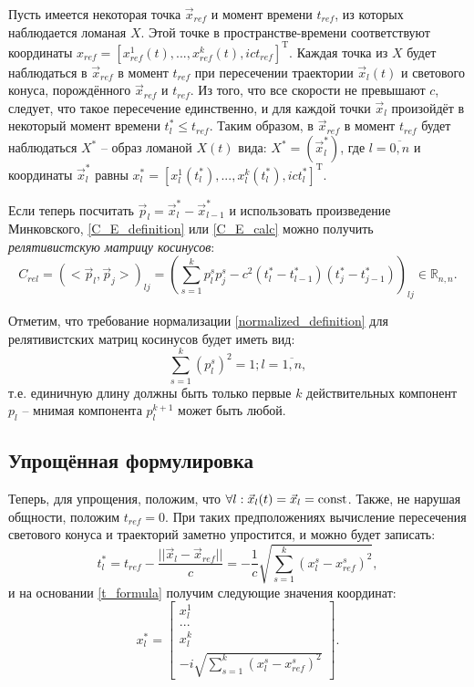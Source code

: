 Пусть имеется некоторая точка $\vec{x}_{ref}$ и момент времени $t_{ref}$, из которых наблюдается ломаная $X$. Этой точке в пространстве-времени соответствуют координаты $x_{ref} = [x^1_{ref}(t), ..., x^k_{ref}(t), ict_{ref}]^\mathrm{T}$. Каждая точка из $X$ будет наблюдаться в $\vec{x}_{ref}$ в момент $t_{ref}$ при пересечении траектории $\vec{x}_l(t)$ и светового конуса, порождённого $\vec{x}_{ref}$ и $t_{ref}$. Из того, что все скорости не превышают $c$, следует, что такое пересечение единственно, и для каждой точки $\vec{x}_l$ произойдёт в некоторый момент времени $t^*_l \le t_{ref}$. Таким образом, в $\vec{x}_{ref}$ в момент $t_{ref}$ будет наблюдаться $X^*$ -- образ ломаной $X(t)$ вида:
$X^* = (\vec{x}^*_l)$, где $l = \overline{0,n}$ и координаты $\vec{x}^*_l$ равны $x^*_l = [x^1_l(t^*_l), ..., x^k_l(t^*_l), ict^*_l]^\mathrm{T}$.

Если теперь посчитать $\vec{p}_l = \vec{x}^*_l - \vec{x}^*_{l-1}$ и использовать произведение Минковского, \ref{C_E_definition} или \ref{C_E_calc} можно получить \textit{релятивистскую матрицу косинусов}:
\begin{equation}
	C_{rel} = {(<\vec{p}_{l}, \vec{p}_{j}>)}_{lj} = {\left(\sum_{s=1}^{k} p^s_l p^s_j - c^2(t^*_l - t^*_{l-1})(t^*_j - t^*_{j-1})\right)}_{lj} \in \mathbb{R}_{n,n}.
	\label{C_rel_definition}
\end{equation}

Отметим, что требование нормализации \ref{normalized_definition} для релятивистских матриц косинусов будет иметь вид:
 \begin{equation}
	\sum_{s=1}^{k} {(p^s_l)}^2 = 1; l = \overline{1,n},
	\label{normalized_definition_rel}
\end{equation}
т.е. единичную длину должны быть только первые $k$ действительных компонент $p_l$ -- мнимая компонента $p^{k+1}_l$ может быть любой.

\subsection{Упрощённая формулировка}
Теперь, для упрощения, положим, что $\forall{l}: \vec{x}_l(t) = \vec{x}_l = \operatorname{const}$. Также, не нарушая общности, положим $t_{ref} = 0$. При таких предположениях вычисление пересечения светового конуса и траекторий заметно упростится, и можно будет записать:
\begin{equation}
	t^*_l = t_{ref} - \frac{||\vec{x}_l - \vec{x}_{ref}||}{c} = -\frac{1}{c}\sqrt{\sum_{s=1}^{k}(x^s_l - x^s_{ref})^2},
	\label{t_formula}
\end{equation}
и на основании \ref{t_formula} получим следующие значения координат:
\begin{equation}
	x^*_l = \begin{bmatrix} x^1_l \\ ... \\ x^k_l \\ -i\sqrt{\sum_{s=1}^{k}(x^s_l - x^s_{ref})^2} \end{bmatrix}.
	\label{x_formula}
\end{equation}

